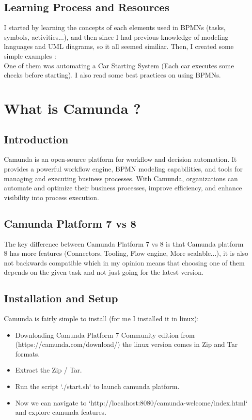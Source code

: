 \documentclass[12pt]{article}
\begin{document}
{  \subsection{Learning Process and Resources}
  I started by learning the concepts of each elements used in BPMNs (tasks, symbols, activities...), and then since I had previous knowledge of modeling languages and UML diagrams, so it all seemed similiar.
  Then, I created some simple examples :
  \\
  One of them was automating a Car Starting System (Each car executes some checks before starting).
  I also read some best practices on using BPMNs.

  \section{What is Camunda ?}

  \subsection{Introduction}

  Camunda is an open-source platform for workflow and decision automation. It provides a powerful workflow engine, BPMN modeling capabilities, and tools for managing and executing business processes. With Camunda, organizations can automate and optimize their business processes, improve efficiency, and enhance visibility into process execution.

  \pagebreak

  \subsection{Camunda Platform 7 vs 8}

  The key difference between Camunda Platform 7 vs 8 is that Camunda platform 8 has more features (Connectors, Tooling, Flow engine, More scalable...), it is also not backwards compatible which in my opinion means that choosing one of them depends on the given task and not just going for the latest version.

  \subsection{Installation and Setup}

  Camunda is fairly simple to install (for me I installed it in linux):

  \begin{itemize}
    \item Downloading Camunda Platform 7 Community edition from (https://camunda.com/download/) the linux version comes in Zip and Tar formats.
    \item Extract the Zip / Tar.
    \item Run the script `./start.sh` to launch camunda platform.
    \item Now we can navigate to `http://localhost:8080/camunda-welcome/index.html` and explore camunda features.
  \end{itemize}

}
\end{document}
